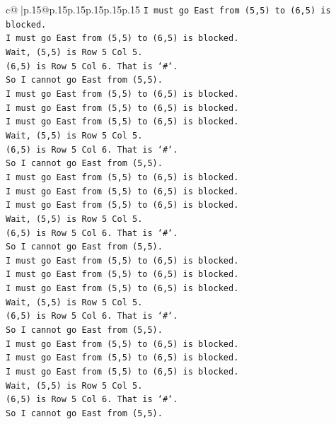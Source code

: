 \documentclass{article}
\begin{document}
{\begin{supertabular}{c@{$\;$}|p{.15\linewidth}@{}p{.15\linewidth}p{.15\linewidth}p{.15\linewidth}p{.15\linewidth}p{.15\linewidth}}
{{{\texttt{I must go East from (5,5) to (6,5) is blocked.} \\
\texttt{I must go East from (5,5) to (6,5) is blocked.} \\
\texttt{Wait, (5,5) is Row 5 Col 5.} \\
\texttt{(6,5) is Row 5 Col 6. That is `\#`.} \\
\texttt{So I cannot go East from (5,5).} \\
\texttt{I must go East from (5,5) to (6,5) is blocked.} \\
\texttt{I must go East from (5,5) to (6,5) is blocked.} \\
\texttt{I must go East from (5,5) to (6,5) is blocked.} \\
\texttt{Wait, (5,5) is Row 5 Col 5.} \\
\texttt{(6,5) is Row 5 Col 6. That is `\#`.} \\
\texttt{So I cannot go East from (5,5).} \\
\texttt{I must go East from (5,5) to (6,5) is blocked.} \\
\texttt{I must go East from (5,5) to (6,5) is blocked.} \\
\texttt{I must go East from (5,5) to (6,5) is blocked.} \\
\texttt{Wait, (5,5) is Row 5 Col 5.} \\
\texttt{(6,5) is Row 5 Col 6. That is `\#`.} \\
\texttt{So I cannot go East from (5,5).} \\
\texttt{I must go East from (5,5) to (6,5) is blocked.} \\
\texttt{I must go East from (5,5) to (6,5) is blocked.} \\
\texttt{I must go East from (5,5) to (6,5) is blocked.} \\
\texttt{Wait, (5,5) is Row 5 Col 5.} \\
\texttt{(6,5) is Row 5 Col 6. That is `\#`.} \\
\texttt{So I cannot go East from (5,5).} \\
\texttt{I must go East from (5,5) to (6,5) is blocked.} \\
\texttt{I must go East from (5,5) to (6,5) is blocked.} \\
\texttt{I must go East from (5,5) to (6,5) is blocked.} \\
\texttt{Wait, (5,5) is Row 5 Col 5.} \\
\texttt{(6,5) is Row 5 Col 6. That is `\#`.} \\
\texttt{So I cannot go East from (5,5).} \\
}}}
\end{supertabular}}
\end{document}
